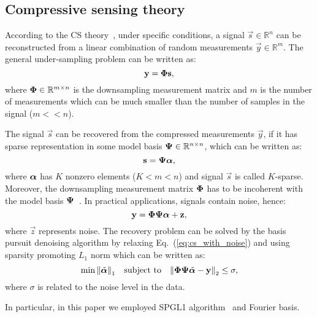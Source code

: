 \subsection{Compressive sensing theory}

According to the CS theory~\cite{Candes2006}, under specific conditions, a signal $\vec{s}\in \mathbb{R}^n$ can be reconstructed from a linear combination of random measurements $\vec{y} \in \mathbb{R}^m$.
The general under-sampling problem can be written as:
\begin{equation}
	\mathbf{y} = \boldsymbol{\Phi} \mathbf{s},
\end{equation}
where $\boldsymbol{\Phi} \in \mathbb{R}^{m\times n}$ is the downsampling measurement matrix and $m$ is the number of measurements which can be much smaller than the number of samples in the signal ($m<<n$).

The signal $\vec{s}$ can be recovered from the compressed measurements $\vec{y}$, if it has sparse representation in some model basis $\boldsymbol{\Psi} \in \mathbb{R}^{n\times n}$, which can be written as:
\begin{equation}
	\mathbf{s} = \boldsymbol{\Psi} \boldsymbol{\alpha},
\end{equation}
where $\boldsymbol{\alpha}$ has $K$ nonzero elements ($K<m<n$) and signal $\vec{s}$ is called $K$-sparse. 
Moreover, the downsampling measurement matrix $\boldsymbol{\Phi}$ has to be incoherent with the model basis $\boldsymbol{\Psi}$~\cite{Candes2007}.
In practical applications, signals contain noise, hence:
\begin{equation}
	\mathbf{y} = \boldsymbol{\Phi} \boldsymbol{\Psi} \boldsymbol{\alpha} + \mathbf{z},
	\label{eq:cs_with_noise}
\end{equation}
where $\vec{z}$ represents noise.
The recovery problem can be solved by the basis pursuit denoising algorithm by relaxing Eq.~(\ref{eq:cs_with_noise}) and using sparsity promoting $L_1$ norm which can be written as:
\begin{equation}
	\min{\lVert \tilde{\boldsymbol{\alpha}} \rVert}_1 \quad \textrm{subject to} \quad {\lVert \boldsymbol{\Phi} \boldsymbol{\Psi} \tilde{\boldsymbol{\alpha}} -\mathbf{y} \rVert}_2 \leq \sigma ,
\end{equation}
where $\sigma$ is related to the noise level in the data.

In particular, in this paper we employed SPGL1 algorithm~\cite{VandenBerg2019} and Fourier basis.